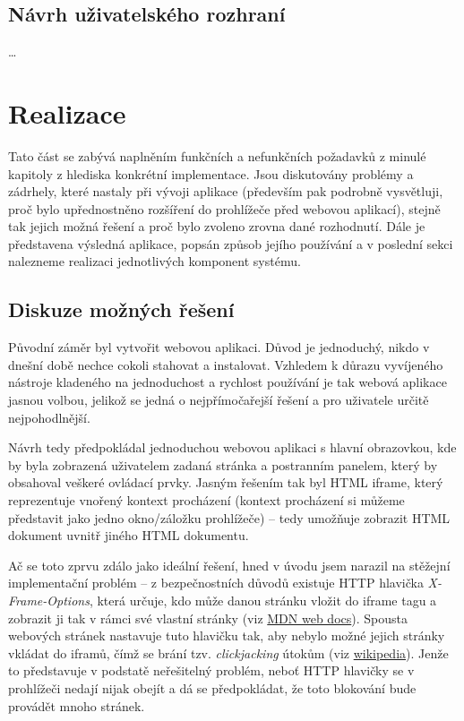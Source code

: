 \documentclass[thesis=B,czech]{FITthesis}[2012/06/26]
\begin{document}

\section{Návrh uživatelského rozhraní}
\dots



\chapter{Realizace}
Tato část se zabývá naplněním funkčních a nefunkčních požadavků z minulé kapitoly z hlediska konkrétní implementace. Jsou diskutovány problémy a zádrhely, které nastaly při vývoji aplikace (především pak podrobně vysvětluji, proč bylo upřednostněno rozšíření do prohlížeče před webovou aplikací), stejně tak jejich možná řešení a proč bylo zvoleno zrovna dané rozhodnutí. Dále je představena výsledná aplikace, popsán způsob jejího používání a v poslední sekci nalezneme realizaci jednotlivých komponent systému.


\label{sec:possible_solutions}
\section{Diskuze možných řešení}
Původní záměr byl vytvořit webovou aplikaci. Důvod je jednoduchý, nikdo v dnešní době nechce cokoli stahovat a instalovat. Vzhledem k důrazu vyvíjeného nástroje kladeného na jednoduchost a rychlost používání je tak webová aplikace jasnou volbou, jelikož se jedná o nejpřímočařejší řešení a pro uživatele určitě nejpohodlnější.

Návrh tedy předpokládal jednoduchou webovou aplikaci s hlavní obrazovkou, kde by byla zobrazená uživatelem zadaná stránka a postranním panelem, který by obsahoval veškeré ovládací prvky. Jasným řešením tak byl HTML iframe, který reprezentuje vnořený kontext procházení (kontext procházení si můžeme představit jako jedno okno/záložku prohlížeče) -- tedy umožňuje zobrazit HTML dokument uvnitř jiného HTML dokumentu.

Ač se toto zprvu zdálo jako ideální řešení, hned v úvodu jsem narazil na stěžejní implementační problém -- z bezpečnostních důvodů existuje HTTP hlavička \emph{X-Frame-Options}, která určuje, kdo může danou stránku vložit do iframe tagu a zobrazit ji tak v rámci své vlastní stránky (viz \href{https://developer.mozilla.org/en-US/docs/Web/HTTP/Headers/X-Frame-Options}{MDN web docs}). Spousta webových stránek nastavuje tuto hlavičku tak, aby nebylo možné jejich stránky vkládat do iframů, čímž se brání tzv. \emph{clickjacking} útokům (viz \href{https://en.wikipedia.org/wiki/Clickjacking}{wikipedia}). Jenže to představuje v podstatě neřešitelný problém, neboť HTTP hlavičky se v prohlížeči nedají nijak obejít a dá se předpokládat, že toto blokování bude provádět mnoho stránek.
\end{document}
